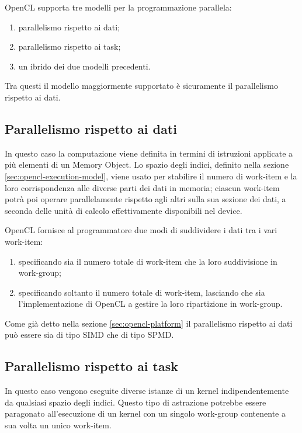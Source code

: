 \documentclass[12pt,a4paper,oneside]{book}
\begin{document}
\ac{OpenCL} supporta tre modelli per la programmazione parallela:
\begin{enumerate}
\item parallelismo rispetto ai dati;
\item parallelismo rispetto ai task;
\item un ibrido dei due modelli precedenti.
\end{enumerate}

Tra questi il modello maggiormente supportato è sicuramente il parallelismo rispetto ai dati.

\subsection{Parallelismo rispetto ai dati}
\label{sec:opencl-data-parallel}

In questo caso la computazione viene definita in termini di istruzioni applicate a più elementi di un Memory Object. Lo spazio degli indici, definito nella sezione \ref{sec:opencl-execution-model}, viene usato per stabilire il numero di work-item e la loro corrispondenza alle diverse parti dei dati in memoria; ciascun work-item potrà poi operare parallelamente rispetto agli altri sulla sua sezione dei dati, a seconda delle unità di calcolo effettivamente disponibili nel device.

\ac{OpenCL} fornisce al programmatore due modi di suddividere i dati tra i vari work-item:
\begin{enumerate}
\item specificando sia il numero totale di work-item che la loro suddivisione in work-group;
\item specificando soltanto il numero totale di work-item, lasciando che sia l'implementazione di \ac{OpenCL} a gestire la loro ripartizione in work-group.
\end{enumerate}

Come già detto nella sezione \ref{sec:opencl-platform} il parallelismo rispetto ai dati può essere sia di tipo \ac{SIMD} che di tipo \ac{SPMD}.

\subsection{Parallelismo rispetto ai task}

In questo caso vengono eseguite diverse istanze di un kernel indipendentemente da qualsiasi spazio degli indici. Questo tipo di astrazione potrebbe essere paragonato all'esecuzione di un kernel con un singolo work-group contenente a sua volta un unico work-item.
\end{document}
